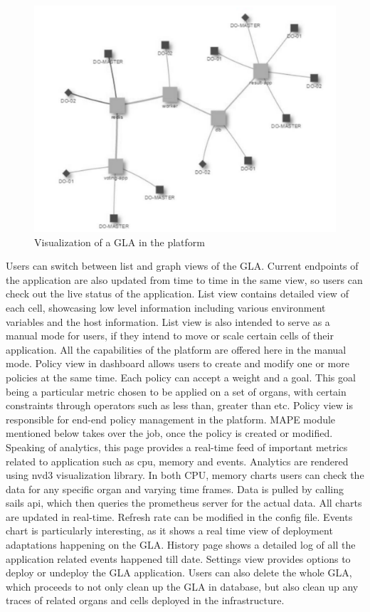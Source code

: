 \documentclass{seal_thesis}
\begin{document}
\begin{figure}[!ht]
\centering
	\includegraphics[width=\textwidth]{gla.pdf}
	\caption{Visualization of a GLA in the platform}
	\label{fig:models}
\end{figure}

Users can switch between list and graph views of the GLA. 
Current endpoints of the application are also updated from time to time in the same view, so users can check out the live status of the application. 
List view contains detailed view of each cell, showcasing low level information including various environment variables and the host information. 
List view is also intended to serve as a manual mode for users, if they intend to move or scale certain cells of their application. 
All the capabilities of the platform are offered here in the manual mode. 
Policy view in dashboard allows users to create and modify one or more policies at the same time. 
Each policy can accept a weight and a goal. 
This goal being a particular metric chosen to be applied on a set of organs, with certain constraints through operators such as less than, greater than etc. 
Policy view is responsible for end-end policy management in the platform. 
MAPE module mentioned below takes over the job, once the policy is created or modified. 
Speaking of analytics, this page provides a real-time feed of important metrics related to application such as cpu, memory and events. 
Analytics are rendered using nvd3 visualization library. 
In both CPU, memory charts users can check the data for any specific organ and varying time frames. 
Data is pulled by calling sails api, which then queries the prometheus server for the actual data. 
All charts are updated in real-time. 
Refresh rate can be modified in the config file. 
Events chart is particularly interesting, as it shows a real time view of deployment adaptations happening on the GLA. 
History page shows a detailed log of all the application related events happened till date. 
Settings view provides options to deploy or undeploy the GLA application. 
Users can also delete the whole GLA, which proceeds to not only clean up the GLA in database, but also clean up any traces of related organs and cells deployed in the infrastructure.
\end{document}
